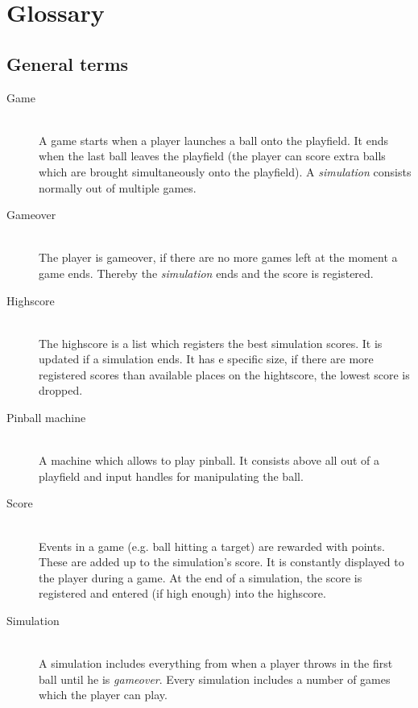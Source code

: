 \documentclass[fontsize=12pt,
               paper=a4,
               twoside=false,
               parskip=half,
               ]{scrartcl}
\begin{document}
\newcommand{\doctitle}{Glossary}


\section*{Glossary}

\subsection*{General terms}

\begin{description}

\item[Game]\hfill \\
A game starts when a player launches a ball onto the playfield. It ends when the last ball leaves the playfield (the player can score extra balls which are brought simultaneously onto the playfield). A \emph{simulation} consists normally out of multiple games.

\item[Gameover]\hfill \\
The player is gameover, if there are no more games left at the moment a game ends. Thereby the \emph{simulation} ends and the score is registered.

\item[Highscore]\hfill \\
The highscore is a list which registers the best simulation scores. It is updated if a simulation ends. It has e specific size, if there are more registered scores than available places on the hightscore, the lowest score is dropped.

\item[Pinball machine] \hfill \\
A machine which allows to play pinball. It consists above all out of a playfield and input handles for manipulating the ball.

\item[Score]\hfill \\
Events in a game (e.g. ball hitting a target) are rewarded with points. These are added up to the simulation's score. It is constantly displayed to the player during a game. At the end of a simulation, the score is registered and entered (if high enough) into the highscore.

\item[Simulation] \hfill \\
A simulation includes everything from when a player throws in the first ball until he is \emph{gameover}. Every simulation includes a number of games which the player can play.

\end{description}
\end{document}
